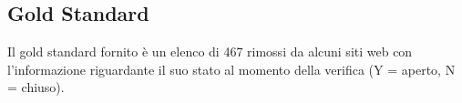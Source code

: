 \documentclass[a4paper,12pt]{article}
\begin{document}
\subsection{Gold Standard}
Il gold standard fornito è un elenco di 467 rimossi da alcuni siti web con l'informazione riguardante il suo stato al momento della verifica (Y = aperto, N = chiuso). 




\newpage
\printbibliography[title=Bibliografia]
\end{document}
